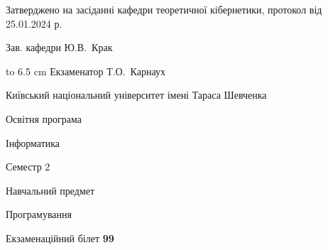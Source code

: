 \documentclass[12pt, ukrainian]{article}
\begin{document}
{\smallskip\smallskip \begin {scriptsize} Затверджено на засіданні кафедри теоретичної кібернетики, протокол   від   25.01.2024 р.\par\smallskip\smallskip\smallskip\smallskip
{\parbox {6.5 cm} {Зав. кафедри \dotfill Ю.В.~Крак}}\hspace {0.7cm} {\hbox to 6.5 cm { Екзаменатор \dotfill Т.О.~Карнаух}} \end{scriptsize}}
\newpage
{{\begin {scriptsize}\par
{ \center  Київський національний університет імені Тараса Шевченка \par}
{\parbox {5 cm}{Освітня програма \hfill}{\parbox {7 cm}{Інформатика\hfill}}\parbox {6 cm}{\hfill Семестр 2}}\par
{\parbox {5 cm} {Навчальний предмет \hfill}\parbox {7 cm}{Програмування \hfill}\parbox {6cm}{\hfill}\par}\vspace{-15pt} \end{scriptsize}}{\center Екзаменаційний білет \No \textbf { 99 }\par}}
\end{document}

